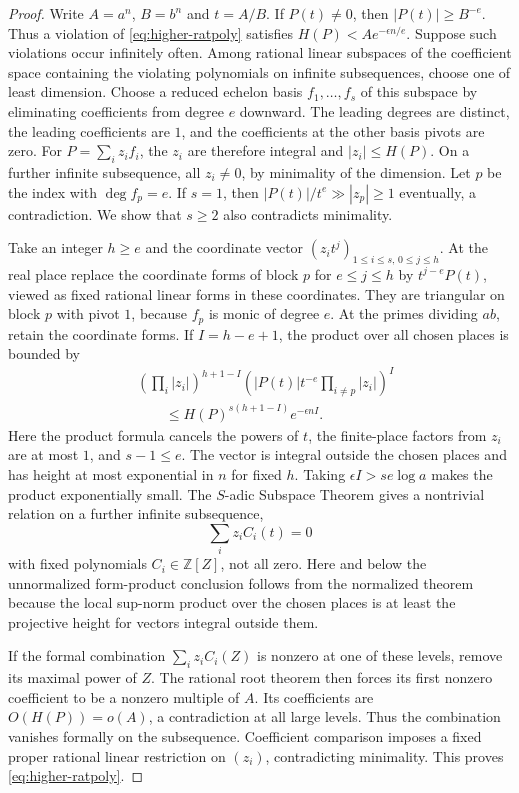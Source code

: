 \documentclass[11pt,a4paper,reqno]{amsart}
\theoremstyle{definition}
\theoremstyle{remark}
\numberwithin{equation}{section}
\begin{document}
\begin{proof}
Write \(A=a^n\), \(B=b^n\) and \(t=A/B\).
If \(P(t)\ne0\), then \(|P(t)|\ge B^{-e}\).
Thus a violation of \eqref{eq:higher-ratpoly} satisfies
\(H(P)<Ae^{-\epsilon n/e}\). Suppose such violations occur
infinitely often. Among rational linear subspaces of the
coefficient space containing the violating polynomials on
infinite subsequences, choose one of least dimension.
Choose a reduced echelon basis \(f_1,\ldots,f_s\) of this
subspace by eliminating coefficients from degree \(e\)
downward. The leading degrees are distinct, the leading
coefficients are \(1\), and the coefficients at the other
basis pivots are zero. For \(P=\sum_i z_i f_i\),
the \(z_i\) are therefore integral and \(|z_i|\le H(P)\).
On a further infinite subsequence, all \(z_i\ne0\),
by minimality of the dimension. Let \(p\) be the index
with \(\deg f_p=e\). If \(s=1\), then
\(|P(t)|/t^e\gg |z_p|\ge1\) eventually, a contradiction.
We show that \(s\ge2\) also contradicts minimality.

Take an integer \(h\ge e\) and the coordinate vector
\((z_i t^j)_{1\le i\le s,\,0\le j\le h}\).
At the real place replace the coordinate forms of block
\(p\) for \(e\le j\le h\) by \(t^{j-e}P(t)\), viewed as
fixed rational linear forms in these coordinates. They
are triangular on block \(p\) with pivot \(1\), because
\(f_p\) is monic of degree \(e\). At the primes dividing
\(ab\), retain the coordinate forms. If \(I=h-e+1\),
the product over all chosen places is bounded by
\begin{align*}
 &\left(\prod_i|z_i|\right)^{h+1-I}
 \left(|P(t)|t^{-e}\prod_{i\ne p}|z_i|\right)^I\\
 &\qquad \le H(P)^{s(h+1-I)}e^{-\epsilon n I}.
\end{align*}
Here the product formula cancels the powers of \(t\),
the finite-place factors from \(z_i\) are at most \(1\),
and \(s-1\le e\). The vector is integral outside the
chosen places and has height at most exponential in \(n\)
for fixed \(h\). Taking \(\epsilon I>se\log a\) makes the
product exponentially small. The \(S\)-adic Subspace
Theorem \cite{Schlickewei} gives a nontrivial
relation on a further infinite subsequence,
\[
                 \sum_i z_i C_i(t)=0
\]
with fixed polynomials \(C_i\in\mathbb Z[Z]\), not all zero.
Here and below the unnormalized form-product conclusion
follows from the normalized theorem because the local
sup-norm product over the chosen places is at least the
projective height for vectors integral outside them.

If the formal combination \(\sum_i z_i C_i(Z)\) is
nonzero at one of these levels, remove its maximal
power of \(Z\). The rational root theorem then forces
its first nonzero coefficient to be a nonzero multiple
of \(A\). Its coefficients are \(O(H(P))=o(A)\), a
contradiction at all large levels. Thus the combination
vanishes formally on the subsequence. Coefficient
comparison imposes a fixed proper rational linear
restriction on \((z_i)\), contradicting minimality.
This proves \eqref{eq:higher-ratpoly}.


\end{proof}
\end{document}
